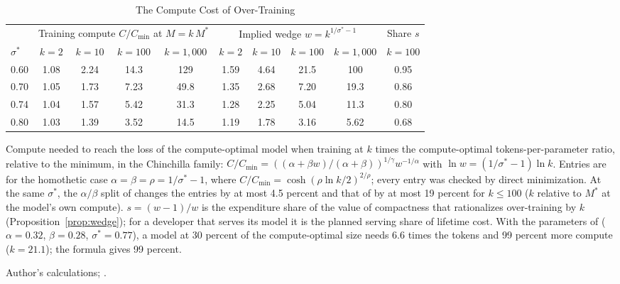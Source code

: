\begin{table}[tp]
\centering
\caption{The Compute Cost of Over-Training}
\label{tab:app-overhead}
\footnotesize
\setlength{\tabcolsep}{3pt}
\begin{tabular*}{\textwidth}{@{\extracolsep{\fill}}lccccccccc@{}}
\toprule
 & \multicolumn{4}{c}{Training compute $C/C_{\min}$ at $M=k\,M^*$} & \multicolumn{4}{c}{Implied wedge $w=k^{1/\sigma^*-1}$} & Share $s$ \\
\cmidrule(lr){2-5}\cmidrule(lr){6-9}\cmidrule(l){10-10}
$\sigma^*$ & $k=2$ & $k=10$ & $k=100$ & $k=1{,}000$ & $k=2$ & $k=10$ & $k=100$ & $k=1{,}000$ & $k=100$ \\
\midrule
0.60 & 1.08 & 2.24 & 14.3 & 129 & 1.59 & 4.64 & 21.5 & 100 & 0.95 \\
0.70 & 1.05 & 1.73 & 7.23 & 49.8 & 1.35 & 2.68 & 7.20 & 19.3 & 0.86 \\
0.74 & 1.04 & 1.57 & 5.42 & 31.3 & 1.28 & 2.25 & 5.04 & 11.3 & 0.80 \\
0.80 & 1.03 & 1.39 & 3.52 & 14.5 & 1.19 & 1.78 & 3.16 & 5.62 & 0.68 \\
\bottomrule
\end{tabular*}
\par\smallskip
\begin{tablenotes}
Compute needed to reach the loss of the compute-optimal model when training at $k$ times the compute-optimal
tokens-per-parameter ratio, relative to the minimum, in the Chinchilla family:
$C/C_{\min}=((\alpha+\beta w)/(\alpha+\beta))^{1/\gamma}w^{-1/\alpha}$ with $\ln w=(1/\sigma^*-1)\ln k$. Entries are for
the homothetic case $\alpha=\beta=\rho=1/\sigma^*-1$, where $C/C_{\min}=\cosh(\rho\ln k/2)^{2/\rho}$; every entry was
checked by direct minimization. At the same $\sigma^*$, the $\alpha/\beta$ split of \citet{besiroglu2024chinchilla}
changes the entries by at most 4.5 percent and that of \citet{hoffmann2022training} by at most 19 percent for $k\le100$
($k$ relative to $M^*$ at the model's own compute). $s=(w-1)/w$ is the expenditure share of the value of compactness
that rationalizes over-training by $k$ (Proposition~\ref{prop:wedge}); for a developer that serves its model it is the
planned serving share of lifetime cost. With the parameters of \citet{devries2023go} ($\alpha=0.32$, $\beta=0.28$,
$\sigma^*=0.77$), a model at 30 percent of the compute-optimal size needs 6.6 times the tokens and 99 percent more
compute ($k=21.1$); the formula gives 99 percent.
\end{tablenotes}
\begin{tablenotes}[Source]
Author's calculations; \citet{devries2023go}.
\end{tablenotes}
\end{table}
